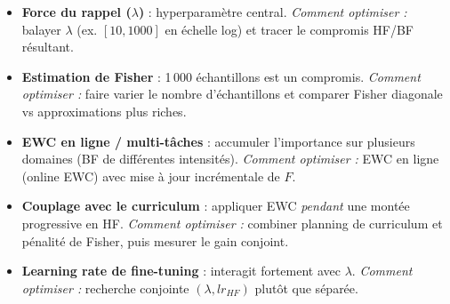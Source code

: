 \documentclass[11pt,a4paper,openany]{book}
\begin{document}
\begin{itemize}
  \item \textbf{Force du rappel ($\lambda$)} : hyperparamètre central. \textit{Comment optimiser :} balayer $\lambda$ (ex. $[10, 1000]$ en échelle log) et tracer le compromis HF/BF résultant.
  \item \textbf{Estimation de Fisher} : 1\,000 échantillons est un compromis. \textit{Comment optimiser :} faire varier le nombre d'échantillons et comparer Fisher diagonale vs approximations plus riches.
  \item \textbf{EWC en ligne / multi-tâches} : accumuler l'importance sur plusieurs domaines (BF de différentes intensités). \textit{Comment optimiser :} EWC en ligne (online EWC) avec mise à jour incrémentale de $F$.
  \item \textbf{Couplage avec le curriculum} : appliquer EWC \emph{pendant} une montée progressive en HF. \textit{Comment optimiser :} combiner planning de curriculum et pénalité de Fisher, puis mesurer le gain conjoint.
  \item \textbf{Learning rate de fine-tuning} : interagit fortement avec $\lambda$. \textit{Comment optimiser :} recherche conjointe $(\lambda, lr_{HF})$ plutôt que séparée.
\end{itemize}
\end{document}
